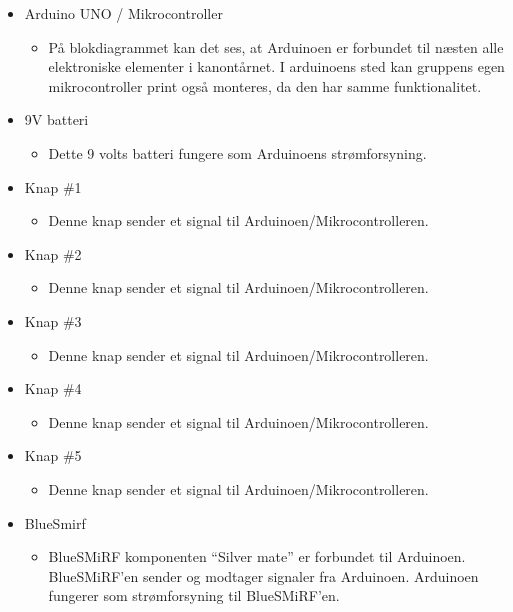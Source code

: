 \begin{itemize}
	\item Arduino UNO / Mikrocontroller
\begin{itemize}
\item På blokdiagrammet kan det ses, at Arduinoen er forbundet til næsten alle elektroniske elementer i kanontårnet. I arduinoens sted kan gruppens egen mikrocontroller print også monteres, da den har samme funktionalitet.
\end{itemize}

	\item 9V batteri
\begin{itemize}
\item Dette 9 volts batteri fungere som Arduinoens strømforsyning.
\end{itemize}

	\item Knap \#1
\begin{itemize}
\item Denne knap sender et signal til Arduinoen/Mikrocontrolleren.
\end{itemize}

	\item Knap \#2
\begin{itemize}
\item Denne knap sender et signal til Arduinoen/Mikrocontrolleren.
\end{itemize}

	\item Knap \#3
\begin{itemize}
\item Denne knap sender et signal til Arduinoen/Mikrocontrolleren.
\end{itemize}

	\item Knap \#4
\begin{itemize}
\item Denne knap sender et signal til Arduinoen/Mikrocontrolleren.
\end{itemize}

	\item Knap \#5
\begin{itemize}
\item Denne knap sender et signal til Arduinoen/Mikrocontrolleren.
\end{itemize}

	\item BlueSmirf
\begin{itemize}
\item BlueSMiRF komponenten “Silver mate” er forbundet til Arduinoen. BlueSMiRF’en sender og modtager signaler fra Arduinoen. Arduinoen fungerer som strømforsyning til BlueSMiRF’en.

\end{itemize}


\end{itemize}



